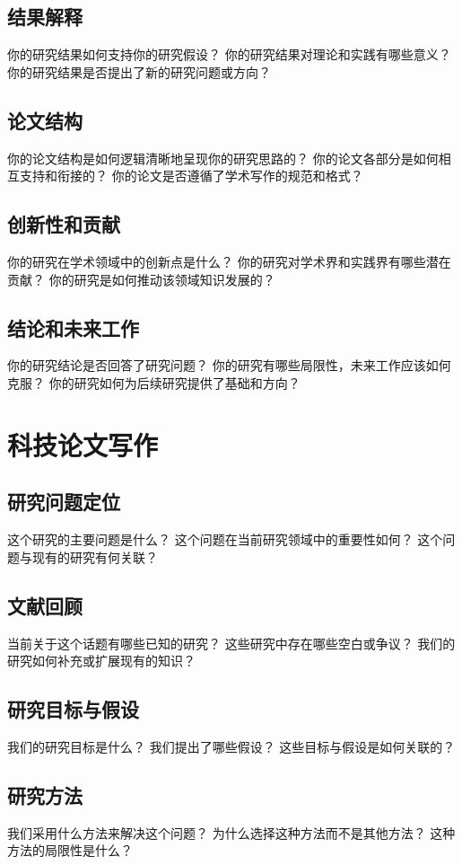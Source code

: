 \documentclass[12pt]{book}
\begin{document}
\subsection{结果解释}
你的研究结果如何支持你的研究假设？
你的研究结果对理论和实践有哪些意义？
你的研究结果是否提出了新的研究问题或方向？

\subsection{论文结构}
你的论文结构是如何逻辑清晰地呈现你的研究思路的？
你的论文各部分是如何相互支持和衔接的？
你的论文是否遵循了学术写作的规范和格式？

\subsection{创新性和贡献}
你的研究在学术领域中的创新点是什么？
你的研究对学术界和实践界有哪些潜在贡献？
你的研究是如何推动该领域知识发展的？

\subsection{结论和未来工作}
你的研究结论是否回答了研究问题？
你的研究有哪些局限性，未来工作应该如何克服？
你的研究如何为后续研究提供了基础和方向？

\section{科技论文写作}
\subsection{研究问题定位}

这个研究的主要问题是什么？
这个问题在当前研究领域中的重要性如何？
这个问题与现有的研究有何关联？

\subsection{文献回顾}
当前关于这个话题有哪些已知的研究？
这些研究中存在哪些空白或争议？
我们的研究如何补充或扩展现有的知识？

\subsection{研究目标与假设}
我们的研究目标是什么？
我们提出了哪些假设？
这些目标与假设是如何关联的？

\subsection{研究方法}
我们采用什么方法来解决这个问题？
为什么选择这种方法而不是其他方法？
这种方法的局限性是什么？
\end{document}
